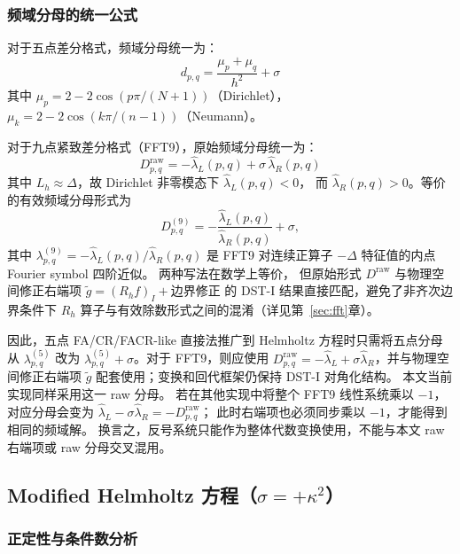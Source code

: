 \subsubsection{频域分母的统一公式}

对于五点差分格式，频域分母统一为：
\begin{equation}
  d_{p,q} = \frac{\mu_p + \mu_q}{h^2} + \sigma
  \label{eq:denom_unified}
\end{equation}
其中 $\mu_p = 2-2\cos(p\pi/(N+1))$（Dirichlet），
$\mu_k = 2-2\cos(k\pi/(n-1))$（Neumann）。

对于九点紧致差分格式（FFT9），原始频域分母统一为：
\begin{equation}
  D_{p,q}^{\mathrm{raw}} = -\hat{\lambda}_L(p,q) + \sigma\,\hat{\lambda}_R(p,q)
  \label{eq:denom_fft9_unified}
\end{equation}
其中 $L_h\approx\Delta$，故 Dirichlet 非零模态下 $\hat{\lambda}_L(p,q)<0$，
而 $\hat{\lambda}_R(p,q)>0$。等价的有效频域分母形式为
\[
  D_{p,q}^{(9)}
  =
  -\frac{\hat{\lambda}_L(p,q)}{\hat{\lambda}_R(p,q)}
  +\sigma,
\]
其中 $\lambda_{p,q}^{(9)}=-\hat{\lambda}_L(p,q)/\hat{\lambda}_R(p,q)$
是 FFT9 对连续正算子 $-\Delta$ 特征值的内点 Fourier symbol 四阶近似。
两种写法在数学上等价，
但原始形式 $D^{\mathrm{raw}}$ 与物理空间修正右端项 $\tilde{g}=(R_h f)_I+\text{边界修正}$ 的
DST-I 结果直接匹配，避免了非齐次边界条件下 $R_h$ 算子与有效除数形式之间的混淆（详见第~\ref{sec:fft}章）。

因此，五点 FA/CR/FACR-like 直接法推广到 Helmholtz 方程时只需将五点分母从
$\lambda_{p,q}^{(5)}$ 改为 $\lambda_{p,q}^{(5)}+\sigma$。对于 FFT9，则应使用
$D_{p,q}^{\mathrm{raw}}=-\hat{\lambda}_L+\sigma\hat{\lambda}_R$，并与物理空间修正右端项
$\tilde{g}$ 配套使用；变换和回代框架仍保持 DST-I 对角化结构。
本文当前实现同样采用这一 raw 分母。
若在其他实现中将整个 FFT9 线性系统乘以 $-1$，对应分母会变为
$\hat{\lambda}_L-\sigma\hat{\lambda}_R=-D_{p,q}^{\mathrm{raw}}$；
此时右端项也必须同步乘以 $-1$，才能得到相同的频域解。
换言之，反号系统只能作为整体代数变换使用，不能与本文 raw 右端项或 raw 分母交叉混用。

\subsection{Modified Helmholtz 方程（$\sigma = +\kappa^2$）}

\subsubsection{正定性与条件数分析}

